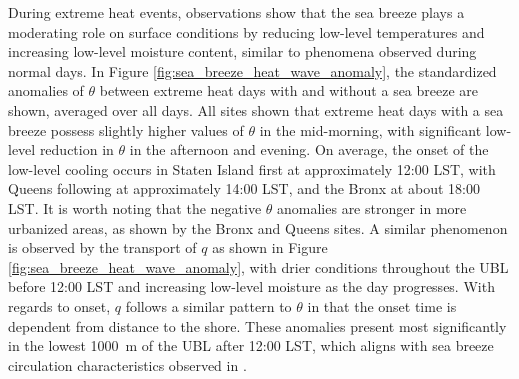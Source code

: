 During extreme heat events, observations show that the sea breeze plays a moderating role on surface conditions by reducing low-level temperatures and increasing low-level moisture content, similar to phenomena observed during normal days. In Figure \ref{fig:sea_breeze_heat_wave_anomaly}, the standardized anomalies of $\theta$ between extreme heat days with and without a sea breeze are shown, averaged over all days. All sites shown that extreme heat days with a sea breeze possess slightly higher values of $\theta$ in the mid-morning, with significant low-level reduction in $\theta$ in the afternoon and evening. On average, the onset of the low-level cooling occurs in Staten Island first at approximately 12:00 LST, with Queens following at approximately 14:00 LST, and the Bronx at about 18:00 LST. It is worth noting that the negative $\theta$ anomalies are stronger in more urbanized areas, as shown by the Bronx and Queens sites. A similar phenomenon is observed by the transport of $q$ as shown in Figure \ref{fig:sea_breeze_heat_wave_anomaly}, with drier conditions throughout the UBL before 12:00 LST and increasing low-level moisture as the day progresses. With regards to onset, $q$ follows a similar pattern to $\theta$ in that the onset time is dependent from distance to the shore. These anomalies present most significantly in the lowest \SI{1000}{\meter} of the UBL after 12:00 LST, which aligns with sea breeze circulation characteristics observed in \citet{frizzola1963}.

